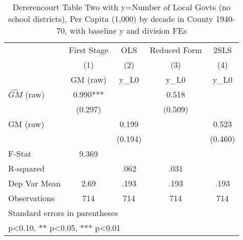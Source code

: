 \begin{table}[htbp]\centering
\def\sym#1{\ifmmode^{#1}\else\(^{#1}\)\fi}
\caption{Dererencourt Table Two with y=Number of Local Govts (no school districts), Per Capita (1,000) by decade in County 1940-70, with baseline y and division FEs}
\begin{tabular}{l*{4}{c}}
\toprule
                    & First Stage   &         OLS   &Reduced Form   &        2SLS   \\
                    &\multicolumn{1}{c}{(1)}&\multicolumn{1}{c}{(2)}&\multicolumn{1}{c}{(3)}&\multicolumn{1}{c}{(4)}\\
                    &\multicolumn{1}{c}{GM  (raw)}&\multicolumn{1}{c}{y\_L0}&\multicolumn{1}{c}{y\_L0}&\multicolumn{1}{c}{y\_L0}\\
\midrule
$\hat{GM}$ (raw)    &       0.990***&               &       0.518   &               \\
                    &     (0.297)   &               &     (0.509)   &               \\
\addlinespace
GM  (raw)           &               &       0.199   &               &       0.523   \\
                    &               &     (0.194)   &               &     (0.460)   \\
\midrule
F-Stat              &       9.369   &               &               &               \\
R-squared           &               &        .062   &        .031   &               \\
Dep Var Mean        &        2.69   &        .193   &        .193   &        .193   \\
Observations        &         714   &         714   &         714   &         714   \\
\bottomrule
\multicolumn{5}{l}{\footnotesize Standard errors in parentheses}\\
\multicolumn{5}{l}{\footnotesize * p<0.10, ** p<0.05, *** p<0.01}\\
\end{tabular}
\end{table}
